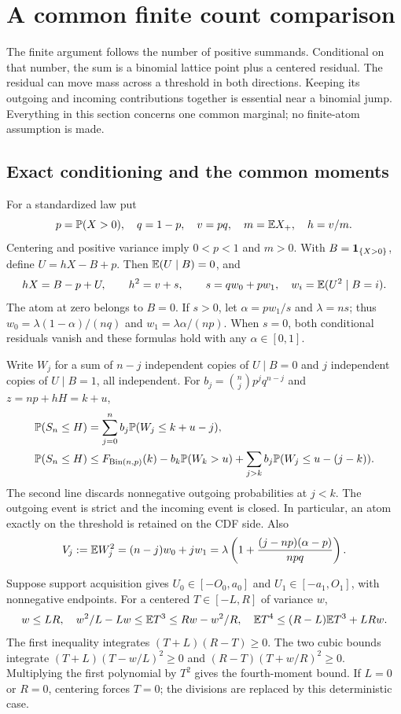 \section{A common finite count comparison}\label{ext:finite-counts}
The finite argument follows the number of positive summands. Conditional on
that number, the sum is a binomial lattice point plus a centered residual.
The residual can move mass across a threshold in both directions. Keeping
its outgoing and incoming contributions together is essential near a
binomial jump. Everything in this section concerns one common marginal;
no finite-atom assumption is made.

\subsection{Exact conditioning and the common moments}
For a standardized law put
\[
 p=\mathbb P(X>0),\quad q=1-p,\quad v=pq,\quad m=\mathbb E X_+,
 \quad h=v/m.
\]
Centering and positive variance imply $0<p<1$ and $m>0$. With
$B=\mathbf 1_{\{X>0\}}$, define $U=hX-B+p$. Then
$\mathbb E(U\mid B)=0$, and
\[
 hX=B-p+U,\qquad h^2=v+s,\qquad
 s=q w_0+p w_1,\quad w_i=\mathbb E(U^2\mid B=i).
\]
The atom at zero belongs to $B=0$. If $s>0$, let
$\alpha=pw_1/s$ and $\lambda=ns$; thus
$w_0=\lambda(1-\alpha)/(nq)$ and $w_1=\lambda\alpha/(np)$.
When $s=0$, both conditional residuals vanish and these formulas hold
with any $\alpha\in[0,1]$.

Write $W_j$ for a sum of $n-j$ independent copies of $U\mid B=0$
and $j$ independent copies of $U\mid B=1$, all independent. For
$b_j=\binom njp^jq^{n-j}$ and $z=np+hH=k+u$,
\begin{align}
 \mathbb P(S_n\le H)&=\sum_{j=0}^n b_j\mathbb P(W_j\le k+u-j),
 \label{ext:count-identity}\\
 \mathbb P(S_n\le H)&\le F_{\mathrm{Bin}(n,p)}(k)
 -b_k\mathbb P(W_k>u)+\sum_{j>k}b_j\mathbb P(W_j\le u-(j-k)).
 \label{ext:count-bound}
\end{align}
The second line discards nonnegative outgoing probabilities at $j<k$.
The outgoing event is strict and the incoming event is closed. In particular,
an atom exactly on the threshold is retained on the CDF side.
Also
\[
 V_j:=\mathbb E W_j^2=(n-j)w_0+jw_1
 =\lambda\left(1+\frac{(j-np)(\alpha-p)}{npq}\right).
\]

Suppose support acquisition gives
$U_0\in[-O_0,a_0]$ and $U_1\in[-a_1,O_1]$, with nonnegative
endpoints. For a centered $T\in[-L,R]$ of variance $w$,
\begin{equation}\label{ext:conditional-moments}
 w\le LR,\quad w^2/L-Lw\le\mathbb E T^3\le Rw-w^2/R,
 \quad \mathbb E T^4\le(R-L)\mathbb E T^3+LRw.
\end{equation}
The first inequality integrates $(T+L)(R-T)\ge0$. The two cubic
bounds integrate $(T+L)(T-w/L)^2\ge0$ and
$(R-T)(T+w/R)^2\ge0$. Multiplying the first polynomial by $T^2$
gives the fourth-moment bound. If $L=0$ or $R=0$, centering forces
$T=0$; the divisions are replaced by this deterministic case.

